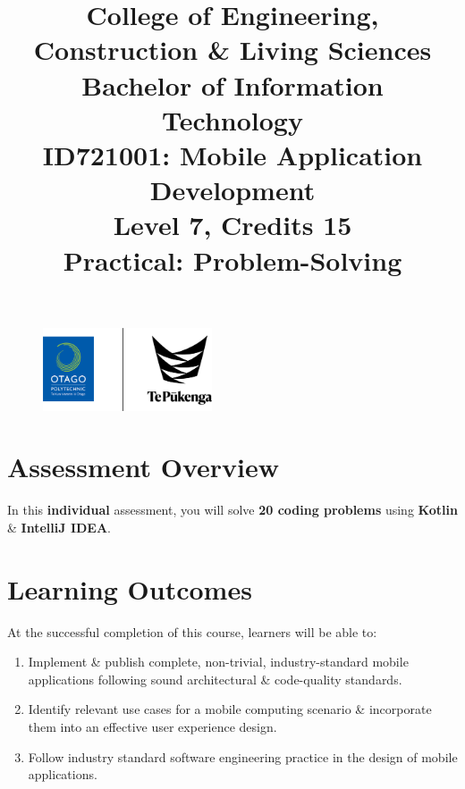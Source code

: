 \documentclass{article}
\author{}
\begin{document}
\begin{figure}
  \centering
  \includegraphics[width=50mm]{../../resources/img/logo.png}
\end{figure}

\title{College of Engineering, Construction \& Living Sciences\\Bachelor of Information Technology\\ID721001: Mobile Application Development\\Level 7, Credits 15\\\textbf{Practical: Problem-Solving}}
\date{}
\maketitle

\section*{Assessment Overview}
In this \textbf{individual} assessment, you will solve \textbf{20 coding problems} using \textbf{Kotlin} \& \textbf{IntelliJ IDEA}.

\section*{Learning Outcomes}
At the successful completion of this course, learners will be able to:
\begin{enumerate}
  \item Implement \& publish complete, non-trivial, industry-standard mobile applications following sound architectural \& code-quality standards.
  \item Identify relevant use cases for a mobile computing scenario \& incorporate them into an effective user experience design.
  \item Follow industry standard software engineering practice in the design of mobile applications.
\end{enumerate}
\end{document}
